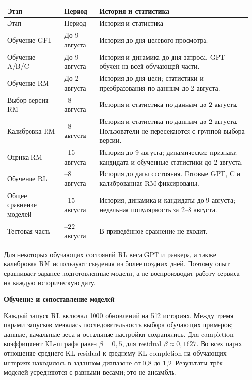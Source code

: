 \documentclass[11pt,a4paper]{article}
\begin{document}
\begin{longtable}{>{\raggedright\arraybackslash}p{3.6cm}>{\raggedright\arraybackslash}p{2.8cm}>{\raggedright\arraybackslash}p{8.1cm}}
\toprule
Этап & Период & История и статистика \\
\midrule
\endfirsthead
\toprule
Этап & Период & История и статистика \\
\midrule
\endhead
Обучение GPT & До 9 августа & История до дня целевого просмотра. \\[4pt]
Обучение A/B/C & До 9 августа & История и динамика до дня запроса. GPT обучен на всей обучающей части. \\[4pt]
Обучение RM & До 2 августа & История до дня цели; статистики и преобразования по данным до 2 августа. \\[4pt]
Выбор версии RM & 2–8 августа & История и статистика по данным до 2 августа. \\[4pt]
Калибровка RM & 2–8 августа & История и статистика по данным до 2 августа. Пользователи не пересекаются с группой выбора версии. \\[4pt]
Оценка RM & 9–15 августа & История до 9 августа; динамические признаки кандидата и обученные статистики до 2 августа. \\[4pt]
Обучение RL & 2–8 августа & История до даты состояния. Готовые GPT, C и калиброванная RM фиксированы. \\[4pt]
Общее сравнение моделей & 9–15 августа & История, динамика и кандидаты до 9 августа; недельная популярность за 2–8 августа. \\[4pt]
Тестовая часть & 16–22 августа & В приведённое сравнение не входит. \\
\bottomrule
\end{longtable}

Для некоторых обучающих состояний RL веса GPT и ранкера, а также калибровка RM используют сведения из более поздних дней. Поэтому опыт сравнивает заранее подготовленные модели, а не воспроизводит работу сервиса на каждую историческую дату.


\textbf{Обучение и сопоставление моделей}

Каждый запуск RL включал 1000 обновлений на 512 историях. Между тремя парами запусков менялась последовательность выбора обучающих примеров; данные, начальные веса и остальные настройки сохранялись. Для completion коэффициент KL-штрафа равен \(\beta=0{,}5\), для residual \(\beta\approx0{,}1627\). Во всех парах отношение среднего KL residual к среднему KL completion на обучающих историях находилось в заданном диапазоне от 0,8 до 1,2. Результаты трёх моделей усредняются с равными весами; это не ансамбль.
\end{document}
